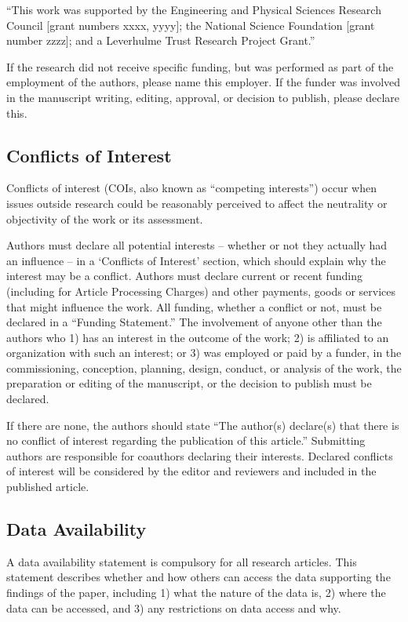 \documentclass{article}
\begin{document}
``This work was supported by the Engineering and Physical Sciences Research Council [grant numbers xxxx, yyyy]; the National Science Foundation [grant number zzzz]; and a Leverhulme Trust Research Project Grant.''

\medskip
If the research did not receive specific funding, but was performed as part of the employment of the authors, please name this employer. If the funder was involved in the manuscript writing, editing, approval, or decision to publish, please declare this.

\subsection*{Conflicts of Interest}
Conflicts of interest (COIs, also known as ``competing interests'') occur when issues outside research could be reasonably perceived to affect the neutrality or objectivity of the work or its assessment.

Authors must declare all potential interests – whether or not they actually had an influence – in a ‘Conflicts of Interest’ section, which should explain why the interest may be a conflict. Authors must declare current or recent funding (including for Article Processing Charges) and other payments, goods or services that might influence the work. All funding, whether a conflict or not, must be declared in a ``Funding Statement.'' The involvement of anyone other than the authors who 1) has an interest in the outcome of the work; 2) is affiliated to an organization with such an interest; or 3) was employed or paid by a funder, in the commissioning, conception, planning, design, conduct, or analysis of the work, the preparation or editing of the manuscript, or the decision to publish must be declared.

If there are none, the authors should state ``The author(s) declare(s) that there is no conflict of interest regarding the publication of this article.'' Submitting authors are responsible for coauthors declaring their interests. Declared conflicts of interest will be considered by the editor and reviewers and included in the published article.

\subsection*{Data Availability}
A data availability statement is compulsory for all research articles. This statement describes whether and how others can access the data supporting the findings of the paper, including 1) what the nature of the data is, 2) where the data can be accessed, and 3) any restrictions on data access and why.
\end{document}
